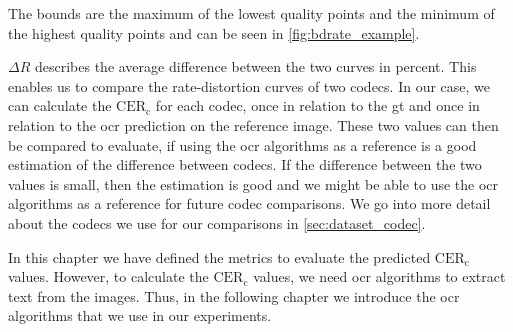 The bounds are the maximum of the lowest quality points and the minimum of the highest quality points and can be seen in \autoref{fig:bdrate_example}.


$\Delta R$ describes the average difference between the two curves in percent.
This enables us to compare the rate-distortion curves of two codecs.
In our case, we can calculate the $\text{CER}_{\text{c}}$ for each codec, once in relation to the \gls{gt} and once in relation to the \gls{ocr} prediction on the reference image.
These two values can then be compared to evaluate, if using the \gls{ocr} algorithms as a reference is a good estimation of the difference between codecs.
If the difference between the two values is small, then the estimation is good and we might be able to use the \gls{ocr} algorithms as a reference for future codec comparisons.
We go into more detail about the codecs we use for our comparisons in \autoref{sec:dataset_codec}.

In this chapter we have defined the metrics to evaluate the predicted $\text{CER}_{\text{c}}$ values.
However, to calculate the $\text{CER}_{\text{c}}$ values, we need \gls{ocr} algorithms to extract text from the images.
Thus, in the following chapter we introduce the \gls{ocr} algorithms that we use in our experiments.

